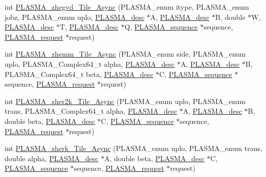 \begin{DoxyCompactItemize}
\item 
int \hyperlink{group__PLASMA__Complex64__t__Tile__Async_ga6065f0455ac9f6b971845fd193055758_ga6065f0455ac9f6b971845fd193055758}{P\+L\+A\+S\+M\+A\+\_\+zhegvd\+\_\+\+Tile\+\_\+\+Async} (P\+L\+A\+S\+M\+A\+\_\+enum itype, P\+L\+A\+S\+M\+A\+\_\+enum jobz, P\+L\+A\+S\+M\+A\+\_\+enum uplo, \hyperlink{structplasma__desc__t}{P\+L\+A\+S\+M\+A\+\_\+desc} $\ast$A, \hyperlink{structplasma__desc__t}{P\+L\+A\+S\+M\+A\+\_\+desc} $\ast$B, double $\ast$W, \hyperlink{structplasma__desc__t}{P\+L\+A\+S\+M\+A\+\_\+desc} $\ast$T, \hyperlink{structplasma__desc__t}{P\+L\+A\+S\+M\+A\+\_\+desc} $\ast$Q, \hyperlink{structplasma__sequence__t}{P\+L\+A\+S\+M\+A\+\_\+sequence} $\ast$sequence, \hyperlink{structplasma__request__t}{P\+L\+A\+S\+M\+A\+\_\+request} $\ast$request)
\item 
int \hyperlink{group__PLASMA__Complex64__t__Tile__Async_gaf9e9ce211da14ccc4a6b2058e91672f6_gaf9e9ce211da14ccc4a6b2058e91672f6}{P\+L\+A\+S\+M\+A\+\_\+zhemm\+\_\+\+Tile\+\_\+\+Async} (P\+L\+A\+S\+M\+A\+\_\+enum side, P\+L\+A\+S\+M\+A\+\_\+enum uplo, P\+L\+A\+S\+M\+A\+\_\+\+Complex64\+\_\+t alpha, \hyperlink{structplasma__desc__t}{P\+L\+A\+S\+M\+A\+\_\+desc} $\ast$A, \hyperlink{structplasma__desc__t}{P\+L\+A\+S\+M\+A\+\_\+desc} $\ast$B, P\+L\+A\+S\+M\+A\+\_\+\+Complex64\+\_\+t beta, \hyperlink{structplasma__desc__t}{P\+L\+A\+S\+M\+A\+\_\+desc} $\ast$C, \hyperlink{structplasma__sequence__t}{P\+L\+A\+S\+M\+A\+\_\+sequence} $\ast$sequence, \hyperlink{structplasma__request__t}{P\+L\+A\+S\+M\+A\+\_\+request} $\ast$request)
\item 
int \hyperlink{group__PLASMA__Complex64__t__Tile__Async_gafd48063459e56ed56962c7fb4bcab829_gafd48063459e56ed56962c7fb4bcab829}{P\+L\+A\+S\+M\+A\+\_\+zher2k\+\_\+\+Tile\+\_\+\+Async} (P\+L\+A\+S\+M\+A\+\_\+enum uplo, P\+L\+A\+S\+M\+A\+\_\+enum trans, P\+L\+A\+S\+M\+A\+\_\+\+Complex64\+\_\+t alpha, \hyperlink{structplasma__desc__t}{P\+L\+A\+S\+M\+A\+\_\+desc} $\ast$A, \hyperlink{structplasma__desc__t}{P\+L\+A\+S\+M\+A\+\_\+desc} $\ast$B, double beta, \hyperlink{structplasma__desc__t}{P\+L\+A\+S\+M\+A\+\_\+desc} $\ast$C, \hyperlink{structplasma__sequence__t}{P\+L\+A\+S\+M\+A\+\_\+sequence} $\ast$sequence, \hyperlink{structplasma__request__t}{P\+L\+A\+S\+M\+A\+\_\+request} $\ast$request)
\item 
int \hyperlink{group__PLASMA__Complex64__t__Tile__Async_ga1b230b4886af07679f6b0788d00df24c_ga1b230b4886af07679f6b0788d00df24c}{P\+L\+A\+S\+M\+A\+\_\+zherk\+\_\+\+Tile\+\_\+\+Async} (P\+L\+A\+S\+M\+A\+\_\+enum uplo, P\+L\+A\+S\+M\+A\+\_\+enum trans, double alpha, \hyperlink{structplasma__desc__t}{P\+L\+A\+S\+M\+A\+\_\+desc} $\ast$A, double beta, \hyperlink{structplasma__desc__t}{P\+L\+A\+S\+M\+A\+\_\+desc} $\ast$C, \hyperlink{structplasma__sequence__t}{P\+L\+A\+S\+M\+A\+\_\+sequence} $\ast$sequence, \hyperlink{structplasma__request__t}{P\+L\+A\+S\+M\+A\+\_\+request} $\ast$request)

\end{DoxyCompactItemize}
